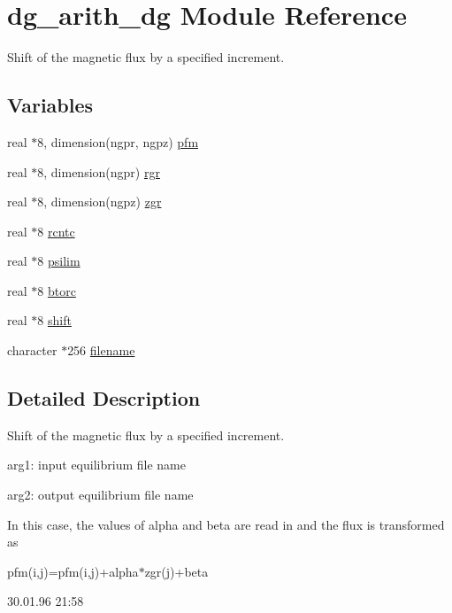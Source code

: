 \hypertarget{namespacedg__arith__dg}{
\section{dg\_\-arith\_\-dg Module Reference}
\label{namespacedg__arith__dg}
}
Shift of the magnetic flux by a specified increment.  


\subsection*{Variables}
\begin{CompactItemize}
\item 
real $\ast$8, dimension(ngpr, ngpz) \hyperlink{namespacedg__arith__dg_1b7f6dcfe1f48dfc989814a1519c6719}{pfm}
\item 
real $\ast$8, dimension(ngpr) \hyperlink{namespacedg__arith__dg_102091a4aff5243e0e79f2a5e5cfffe2}{rgr}
\item 
real $\ast$8, dimension(ngpz) \hyperlink{namespacedg__arith__dg_8a5f886abc8b62b69d48cfd735cfd10b}{zgr}
\item 
real $\ast$8 \hyperlink{namespacedg__arith__dg_3dc865564702fd81046c19f0a8f35140}{rcntc}
\item 
real $\ast$8 \hyperlink{namespacedg__arith__dg_456997baf11ae7fdf46a2643ced4568f}{psilim}
\item 
real $\ast$8 \hyperlink{namespacedg__arith__dg_7a992e5a439388ce2c9624a01757a066}{btorc}
\item 
real $\ast$8 \hyperlink{namespacedg__arith__dg_e54e3bfed258b16e900ebe885e898537}{shift}
\item 
character $\ast$256 \hyperlink{namespacedg__arith__dg_e5e4ec783b359df8e12cc4bda2a44ea1}{filename}
\end{CompactItemize}


\subsection{Detailed Description}
Shift of the magnetic flux by a specified increment. 

arg1: input equilibrium file name

arg2: output equilibrium file name

In this case, the values of alpha and beta are read in and the flux is transformed as

pfm(i,j)=pfm(i,j)+alpha$\ast$zgr(j)+beta

\begin{Desc}
\item[Version:]30.01.96 21:58 \end{Desc}


